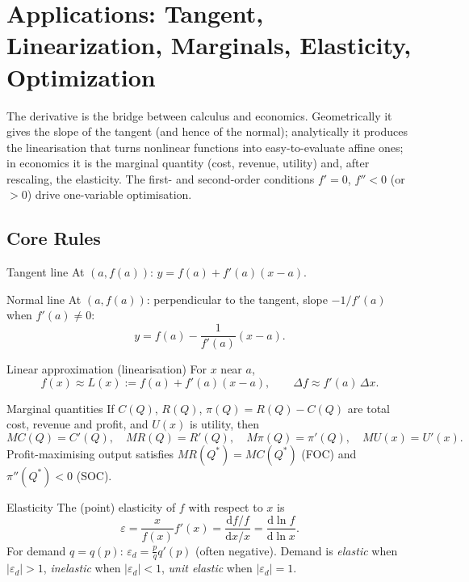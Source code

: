 \chapter{Applications: Tangent, Linearization, Marginals, Elasticity, Optimization}

The derivative is the bridge between calculus and economics. Geometrically it
gives the slope of the tangent (and hence of the normal); analytically it
produces the linearisation that turns nonlinear functions into
easy-to-evaluate affine ones; in economics it is the marginal quantity
(cost, revenue, utility) and, after rescaling, the elasticity. The first-
and second-order conditions $f'=0$, $f''<0$ (or $>0$) drive one-variable
optimisation.

\section{Core Rules}

\begin{rulebox}{Tangent line}
At $(a,f(a))$: $y = f(a) + f'(a)(x-a)$.
\end{rulebox}

\begin{rulebox}{Normal line}
At $(a,f(a))$: perpendicular to the tangent, slope $-1/f'(a)$ when
$f'(a)\neq 0$:
\[
  y = f(a) - \frac{1}{f'(a)}(x-a).
\]
\end{rulebox}

\begin{rulebox}{Linear approximation (linearisation)}
For $x$ near $a$,
\[
  f(x) \approx L(x) := f(a) + f'(a)(x-a), \qquad \Delta f \approx f'(a)\,\Delta x .
\]
\end{rulebox}

\begin{rulebox}{Marginal quantities}
If $C(Q)$, $R(Q)$, $\pi(Q)=R(Q)-C(Q)$ are total cost, revenue and profit,
and $U(x)$ is utility, then
\[
  MC(Q)=C'(Q), \quad MR(Q)=R'(Q), \quad M\pi(Q)=\pi'(Q), \quad MU(x)=U'(x).
\]
Profit-maximising output satisfies $MR(Q^*)=MC(Q^*)$ (FOC) and
$\pi''(Q^*)<0$ (SOC).
\end{rulebox}

\begin{rulebox}{Elasticity}
The (point) elasticity of $f$ with respect to $x$ is
\[
  \varepsilon = \frac{x}{f(x)}f'(x) = \frac{\mathrm{d}f/f}{\mathrm{d}x/x}
    = \frac{\mathrm{d}\ln f}{\mathrm{d}\ln x} .
\]
For demand $q=q(p)$: $\displaystyle \varepsilon_d = \frac{p}{q}q'(p)$
(often negative). Demand is \emph{elastic} when $|\varepsilon_d|>1$,
\emph{inelastic} when $|\varepsilon_d|<1$, \emph{unit elastic} when
$|\varepsilon_d|=1$.
\end{rulebox}

